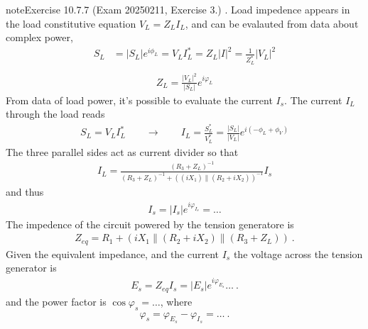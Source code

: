 \documentclass[letterpaper,10pt,italian]{jupyterBook}
\begin{document}
\begin{sphinxadmonition}{note}{Exercise 10.7.7 (Exam 2025\sphinxhyphen{}02\sphinxhyphen{}11, Exercise 3.)}
\sphinxAtStartPar
{}. Load impedence appears in the load constitutive equation \(V_L = Z_L I_L\), and can be evalauted from data about complex power,
\begin{equation*}
\begin{split}
   S_L  & = |S_L| e^{i \phi_L} = V_L I_L^* = Z_L |I|^2 = \frac{1}{Z_L^*} |V_L|^2 \\ 
\end{split}
\end{equation*}\begin{equation*}
\begin{split}Z_L = \frac{|V_L|^2}{|S_L|} e^{i \varphi_L}\end{split}
\end{equation*}
\sphinxAtStartPar
{} From data of load power, it’s possible to evaluate the current \(I_s\). The current \(I_L\) through the load reads
\begin{equation*}
\begin{split}S_L = V_L I_L^* \qquad \rightarrow \qquad I_L = \frac{S_L^*}{V_L^*} = \frac{|S_L|}{|V_L|} e^{i(-\phi_L + \phi_V)}\end{split}
\end{equation*}
\sphinxAtStartPar
The three parallel sides act as current divider so that
\begin{equation*}
\begin{split}I_L = \frac{(R_3+Z_L)^{-1}}{(R_3+Z_L)^{-1} + ( (i X_1 ) \parallel (R_2 + i X_2) )^{-1}} I_s\end{split}
\end{equation*}
\sphinxAtStartPar
and thus
\begin{equation*}
\begin{split}I_s = |I_s| e^{i \varphi_{I_s}} = \dots\end{split}
\end{equation*}
\sphinxAtStartPar
{} The impedence of the circuit powered by the tension generatore is
\begin{equation*}
\begin{split}Z_{eq} = R_1 + ( i X_1 \parallel (R_2 + i X_2) \parallel (R_3 + Z_L) ) \ .\end{split}
\end{equation*}
\sphinxAtStartPar
Given the equivalent impedance, and the current \(I_s\) the voltage across the tension generator is
\begin{equation*}
\begin{split}E_s = Z_{eq} I_s = |E_s| e^{i \varphi_{E_s}} \dots \ .\end{split}
\end{equation*}
\sphinxAtStartPar
and the power factor is \(\cos \varphi_s = \dots\), where
\begin{equation*}
\begin{split}\varphi_s = \varphi_{E_s} - \varphi_{I_s} = \dots \ . \end{split}
\end{equation*}\end{sphinxadmonition}
 \label{exercise:exam-25-01-22-exe-02}
\end{document}
